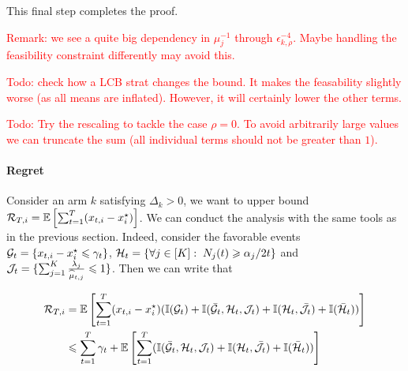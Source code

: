 This final step completes the proof. 

\textcolor{red}{Remark: we see a quite big dependency in $\mu_j^{-1}$ through $\epsilon_{k, \rho}^{-4}$. Maybe handling the feasibility constraint differently may avoid this.}

\textcolor{red}{Todo: check how a LCB strat changes the bound. It makes the feasability slightly worse (as all means are inflated). However, it will certainly lower the other terms.}

\textcolor{red}{Todo: Try the rescaling to tackle the case $\rho = 0$. To avoid arbitrarily large values we can truncate the sum (all individual terms should not be greater than $1$).}


\paragraph{Regret} Consider an arm $k$ satisfying $\Delta_k>0$, we want to upper bound $\mathcal{R}_{T, i} =  \mathbb{E}\left[\sum_{t=1}^T (x_{t, i} - x^\star_i)\right]$. We can conduct the analysis with the same tools as in the previous section. Indeed, consider the favorable events $\mathcal{G}_t = \{x_{t,i}-x_i^\star\leqslant \gamma_t \}$, $\mathcal{H}_t=\{\forall j \in [K]: \; N_j(t)\geqslant \alpha_j/2 t \}$ and $\mathcal{J}_t = \{\sum_{j=1}^K \frac{\lambda_j}{\widehat{\mu}_{t,j}}\leqslant 1 \}$. Then we can write that 

\begin{align*}
\mathcal{R}_{T,i} &= \mathbb{E}\left[\sum_{t=1}^T (x_{t, i} - x^\star_i)(\mathbb{I}(\mathcal{G}_t)+\mathbb{I}(\bar {\mathcal{G}}_t, \mathcal{H}_t, \mathcal{J}_t)+ \mathbb{I}(\mathcal{H}_t, \bar {\mathcal{J}}_t)+ \mathbb{I}(\bar{\mathcal{H}}_t))\right] \\
& \leqslant \sum_{t=1}^T \gamma_t + \mathbb{E}\left[\sum_{t=1}^T (\mathbb{I}(\bar {\mathcal{G}}_t, \mathcal{H}_t, \mathcal{J}_t)+ \mathbb{I}(\mathcal{H}_t, \bar {\mathcal{J}}_t)+ \mathbb{I}(\bar{\mathcal{H}}_t))\right]
\end{align*}


